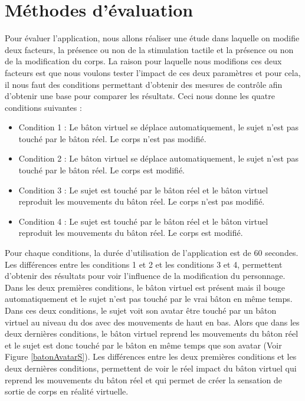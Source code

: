 \section{Méthodes d'évaluation}

Pour évaluer l'application, nous allons réaliser une étude dans laquelle on modifie deux facteurs, la présence ou non de la stimulation tactile et la présence ou non de la modification du corps. La raison pour laquelle nous modifions ces deux facteurs est que nous voulons tester l'impact de ces deux paramètres et pour cela, il nous faut des conditions permettant d'obtenir des mesures de contrôle afin d'obtenir une base pour comparer les résultats. Ceci nous donne les quatre conditions suivantes :
\begin{itemize}
\item Condition 1 : Le bâton virtuel se déplace automatiquement, le sujet n'est pas touché par le bâton réel. Le corps n'est pas modifié.
\item Condition 2 : Le bâton virtuel se déplace automatiquement, le sujet n'est pas touché par le bâton réel. Le corps est modifié.
\item Condition 3 : Le sujet est touché par le bâton réel et le bâton virtuel reproduit les mouvements du bâton réel. Le corps n'est pas modifié.
\item Condition 4 : Le sujet est touché par le bâton réel et le bâton virtuel reproduit les mouvements du bâton réel. Le corps est modifié.
\end{itemize}
Pour chaque conditions, la durée d'utilisation de l'application est de 60 secondes. Les différences entre les conditions 1 et 2 et les conditions 3 et 4, permettent d'obtenir des résultats pour voir l'influence de la modification du personnage. Dans les deux premières conditions, le bâton virtuel est présent mais il bouge automatiquement et le sujet n'est pas touché par le vrai bâton en même temps. Dans ces deux conditions, le sujet voit son avatar être touché par un bâton virtuel au niveau du dos avec des mouvements de haut en bas. Alors que dans les deux dernières conditions, le bâton virtuel reprend les mouvements du bâton réel et le sujet est donc touché par le bâton en même temps que son avatar (Voir Figure \ref{batonAvatarS}). Les différences entre les deux premières conditions et les deux dernières conditions, permettent de voir le réel impact du bâton virtuel qui reprend les mouvements du bâton réel et qui permet de créer la sensation de sortie de corps en réalité virtuelle.\\

